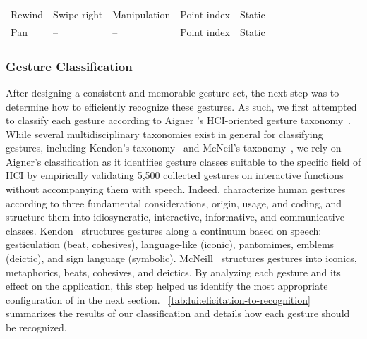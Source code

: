 \begin{minipage}{\textwidth}
\begin{minipage}[c]{0.70\textwidth}
{\begin{tabular}{lll|ll}
        Rewind & Swipe right & \cellcolor{manipulation} Manipulation & Point index & Static \\
        Pan & -- & -- & Point index & Static \\
        \bottomrule
    \end{tabular}
    }
    \vspace{-8pt}
    \captionsetup{width=.9\linewidth}
  \label{tab:lui:elicitation-to-recognition}
\end{minipage}
\vspace{-10pt}
\end{minipage}


\subsubsection{Gesture Classification} %
After designing a consistent and memorable gesture set, the next step was to determine how to efficiently recognize these gestures. As such, we first attempted to classify each gesture according to Aigner \etal's HCI-oriented gesture taxonomy~\cite{Aigner:2012}. While several multidisciplinary taxonomies exist in general for classifying gestures, including Kendon's taxonomy~\cite{Kendon:1988} and McNeil's taxonomy~\cite{McNeill:1995}, we rely on Aigner's classification as it identifies gesture classes suitable to the specific field of HCI by empirically validating 5,500 collected gestures on interactive functions without accompanying them with speech. Indeed, \cite{Ekman:1969} characterize human gestures according to three fundamental considerations, \ie origin, usage, and coding, and structure them into idiosyncratic, interactive, informative, and communicative classes.
Kendon~\cite{Kendon:1988} structures gestures along a continuum based on speech: gesticulation (beat, cohesives), language-like
(iconic), pantomimes, emblems (deictic), and sign language
(symbolic). McNeill~\cite{McNeill:1995} structures gestures into iconics, metaphorics, beats, cohesives, and deictics. 
By analyzing each gesture and its effect on the application, this step helped us identify the most appropriate configuration of \ql in the next section. \tab~\ref{tab:lui:elicitation-to-recognition} summarizes the results of our classification and details how each gesture should be recognized.


